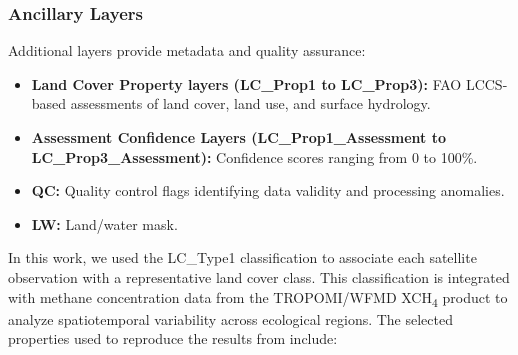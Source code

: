 \subsubsection{Ancillary Layers}
Additional layers provide metadata and quality assurance:
\begin{itemize}
	\item \textbf{Land Cover Property layers (LC\_Prop1 to LC\_Prop3):} FAO LCCS-based assessments of land cover, land use, and surface hydrology.
	\item \textbf{Assessment Confidence Layers (LC\_Prop1\_Assessment to LC\_Prop3\_Assessment):} Confidence scores ranging from 0 to 100\%.
	\item \textbf{QC:} Quality control flags identifying data validity and processing anomalies.
	\item \textbf{LW:} Land/water mask.
\end{itemize}

In this work, we used the LC\_Type1 classification to associate each satellite observation with a representative land cover class. This classification is integrated with methane concentration data from the TROPOMI/WFMD XCH\textsubscript{4} product to analyze spatiotemporal variability across ecological regions. The selected properties used to reproduce the results from \cite{Karoff2023} include:

